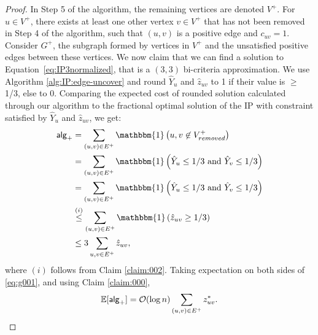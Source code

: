 	\begin{proof}
	In Step 5 of the algorithm, the remaining vertices are denoted $V^+$. For $u \in V^+$, there exists at least one other vertex $v \in V^+$ that has not been removed in Step 4 of the algorithm, such that $(u,v)$ is a positive edge and $c_{uv} = 1$. Consider $G^+$, the subgraph formed by vertices in $V^+$ and the unsatisfied positive edges between these vertices.
	We now claim that we can find a solution to Equation~\ref{eq:IP3normalized}, that is a $(3,3)$ bi-criteria approximation. We use Algorithm \ref{alg:IP:edge-uncover} and round $\hat{Y}_u$ and $\hat{z}_{uv}$ to 1 if their value is $\geq$ 1/3, else to $0$. Comparing the expected cost of rounded solution calculated through our algorithm to the fractional optimal solution of the IP with constraint satisfied by $\hat{Y}_u$ and $\hat{z}_{uv}$, we get:
	\begin{align}
	    \alg_+ &= \sum_{(u,v) \in E^+} \mathbbm{1} \left( u,v \not\in V_{removed}^+ \right) \nonumber\\
	    &= \sum_{(u,v) \in E^+} \mathbbm{1} \left( \hat{Y}_u \le 1/3 \text{ and } \hat{Y}_v \le 1/3 \right) \nonumber\\
	    &= \sum_{(u,v) \in E^+} \mathbbm{1} \left( \hat{Y}_u \le 1/3 \text{ and } \hat{Y}_v \le1/3 \right) \nonumber\\
	    &\overset{(i)}{\le} \sum_{(u,v) \in E^+} \mathbbm{1} \left( \hat{z}_{uv} \ge 1/3 \right) \nonumber\\
	    &\le 3 \sum_{u,v \in E^+} \hat{z}_{uv}, \label{eq:g001}
    \end{align}
    where $(i)$ follows from Claim \ref{claim:002}. Taking expectation on both sides of \eqref{eq:g001}, and using Claim \ref{claim:000},
    \begin{equation*}
	    \mathbb{E}[\mathsf{alg}_+] = \mathcal{O}(\log n) \sum_{(u,v) \in E^+} z^*_{uv}.
	\end{equation*}

\end{proof}
